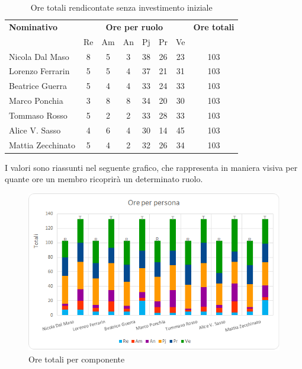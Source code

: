 \begin{table}[H]
	\centering
	\begin{tabular}{|l|c|c|c|c|c|c|c|}
		\hline
		\textbf{Nominativo} & 
		\multicolumn{6}{c|}{\textbf{Ore per ruolo}} & 
		\textbf{Ore totali} \\
		& Re & Am & An & Pj & Pr & Ve & \\
		\hline
		Nicola Dal Maso &8 &5 &3 &38 &26 &23 & 103 \\
		Lorenzo Ferrarin &5 &5 &4 &37 &21 &31 & 103 \\
		Beatrice Guerra &5 &4 &4 &33 &24 &33 & 103 \\
		Marco Ponchia &3 &8 &8 &34 &20 &30 & 103 \\
		Tommaso Rosso &5 &2 &2 &33 &28 &33 & 103 \\
		Alice V. Sasso &4 &6 &4 &30 &14 &45 & 103 \\
		Mattia Zecchinato &5 &4 &2 &32 &26 &34 & 103 \\
		\hline
	\end{tabular}
	\caption{Ore totali rendicontate senza investimento iniziale}
\end{table}
I valori sono riassunti nel seguente grafico, che rappresenta in maniera visiva per quante ore un membro ricoprirà un determinato ruolo.
\begin{figure}[H]
	\centering
	\includegraphics[width=14cm]{img_suddlavoro/TOT2.png}
	\caption{Ore totali per componente}
\end{figure}





